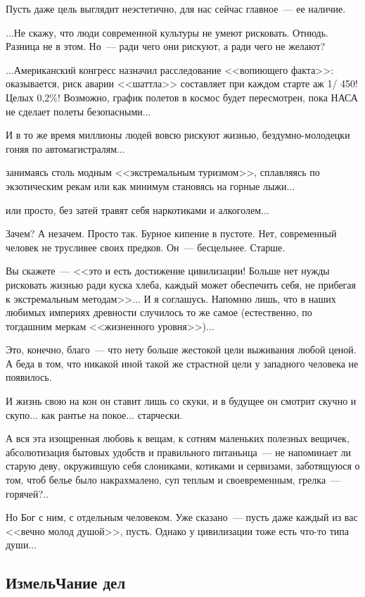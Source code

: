 \documentclass{scrbook}
\newcommand{\flqq}{<<}
\newcommand{\frqq}{>>}
\newcommand{\mdash}{~--- }
\newcommand{\essaysection}[1]{\subsection*{#1}\nopagebreak}
\begin{document}
Пусть даже цель выглядит неэстетично, для нас сейчас главное{\mdash}ее наличие.

...Не скажу, что люди современной культуры не умеют рисковать. Отнюдь. Разница не в этом. Но{\mdash}ради чего они рискуют, а ради чего не желают?

...Американский конгресс назначил расследование {\flqq}вопиющего факта{\frqq}: оказывается, риск аварии {\flqq}шаттла{\frqq} составляет при каждом старте аж 1/ 450! Целых 0,2\%! Возможно, график полетов в космос будет пересмотрен, пока НАСА не сделает полеты безопасными...

И в то же время миллионы людей вовсю рискуют жизнью, бездумно-молодецки гоняя по автомагистралям...

занимаясь столь модным {\flqq}экстремальным туризмом{\frqq}, сплавляясь по экзотическим рекам или как минимум становясь на горные лыжи...

или просто, без затей травят себя наркотиками и алкоголем...

Зачем? А незачем. Просто так. Бурное кипение в пустоте. Нет, современный человек не трусливее своих предков. Он{\mdash}бесцельнее. Старше.

Вы скажете{\mdash}{\flqq}это и есть достижение цивилизации! Больше нет нужды рисковать жизнью ради куска хлеба, каждый может обеспечить себя, не прибегая к экстремальным методам{\frqq}... И я соглашусь. Напомню лишь, что в наших любимых империях древности случилось то же самое (естественно, по тогдашним меркам {\flqq}жизненного уровня{\frqq})...

Это, конечно, благо{\mdash}что нету больше жестокой цели выживания любой ценой. А беда в том, что никакой иной такой же страстной цели у западного человека не появилось.

И жизнь свою на кон он ставит лишь со скуки, и в будущее он смотрит скучно и скупо... как рантье на покое... старчески.

А вся эта изощренная любовь к вещам, к сотням маленьких полезных вещичек, абсолютизация бытовых удобств и правильного питаньица{\mdash}не напоминает ли старую деву, окружившую себя слониками, котиками и сервизами, заботящуюся о том, чтоб белье было накрахмалено, суп теплым и своевременным, грелка{\mdash}горячей?..

Но Бог с ним, с отдельным человеком. Уже сказано{\mdash}пусть даже каждый из вас {\flqq}вечно молод душой{\frqq}, пусть. Однако у цивилизации тоже есть что-то типа души...

\essaysection{ИзмельЧание дел}
\end{document}
